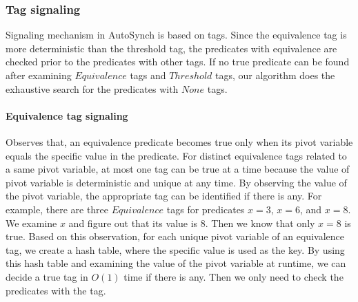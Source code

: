 \documentclass[preprint]{sigplanconf}
\begin{document}
\subsubsection{Tag signaling}
Signaling mechanism in AutoSynch is based on tags. 
Since the equivalence tag is more deterministic than the threshold tag, the
predicates with equivalence are checked prior to the predicates with other 
tags. If no true predicate can be found after examining $Equivalence$ tags and
$Threshold$ tags, our algorithm does the exhaustive search for the predicates 
with $None$ tags. 

\paragraph{Equivalence tag signaling}
Observes that, an equivalence predicate becomes true only when its pivot 
variable equals the specific value in the predicate. For distinct equivalence 
tags related to a same pivot variable, at most one tag can be true at a time 
because the value of pivot variable is deterministic and unique at any time. By 
observing the value of the pivot variable, the appropriate tag can be 
identified if there is any. For example, there are three $Equivalence$ tags for
predicates $x = 3$, $x = 6$, and $x = 8$. We examine $x$ and figure out that
its value is $8$. Then we know that only $x = 8$ is true. Based on this 
observation, for each unique pivot variable of an equivalence tag, we create a 
hash table, where the specific value is used as the key. By using this hash 
table and examining the value of the pivot variable at runtime, we can decide a
true tag in $O(1)$ time if there is any. Then we only need to check the 
predicates with the tag. 

\end{document}

